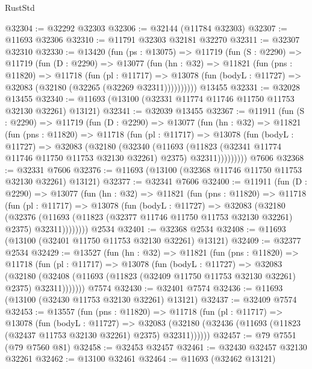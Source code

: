 \begin{lexlean}{RustStd}
\begin{coremodule}
@32304 := @32292 @32303
@32306 := @32144 (@11784 @32303)
@32307 := @11693 @32306
@32310 := @11791 @32303 @32181 @32270
@32311 := @32307 @32310
@32330 := @13420
    (fun (ps : @13075) =>
    @11719
      (fun (S : @2290) =>
      @11719
        (fun (D : @2290) =>
        @13077
          (fun (hn : @32) =>
          @11821
            (fun (pns : @11820) =>
            @11718
              (fun (pl : @11717) =>
              @13078 (fun (bodyL : @11727) => @32083 (@32180 (@32265 (@32269 @32311))))))))))
    @13455
@32331 := @32028 @13455
@32340 := @11693 (@13100 (@32331 @11774 @11746 @11750 @11753 @32130 @32261) @13121)
@32341 := @32039 @13455
@32367 := @11911
    (fun (S : @2290) =>
    @11719
      (fun (D : @2290) =>
      @13077
        (fun (hn : @32) =>
        @11821
          (fun (pns : @11820) =>
          @11718
            (fun (pl : @11717) =>
            @13078
              (fun (bodyL : @11727) =>
              @32083
                (@32180
                  (@32340
                    (@11693
                      (@11823 (@32341 @11774 @11746 @11750 @11753 @32130 @32261) @2375)
                      @32311)))))))))
    @7606
@32368 := @32331 @7606
@32376 := @11693 (@13100 (@32368 @11746 @11750 @11753 @32130 @32261) @13121)
@32377 := @32341 @7606
@32400 := @11911
    (fun (D : @2290) =>
    @13077
      (fun (hn : @32) =>
      @11821
        (fun (pns : @11820) =>
        @11718
          (fun (pl : @11717) =>
          @13078
            (fun (bodyL : @11727) =>
            @32083
              (@32180
                (@32376
                  (@11693 (@11823 (@32377 @11746 @11750 @11753 @32130 @32261) @2375) @32311))))))))
    @2534
@32401 := @32368 @2534
@32408 := @11693 (@13100 (@32401 @11750 @11753 @32130 @32261) @13121)
@32409 := @32377 @2534
@32429 := @13527
    (fun (hn : @32) =>
    @11821
      (fun (pns : @11820) =>
      @11718
        (fun (pl : @11717) =>
        @13078
          (fun (bodyL : @11727) =>
          @32083
            (@32180
              (@32408 (@11693 (@11823 (@32409 @11750 @11753 @32130 @32261) @2375) @32311)))))))
    @7574
@32430 := @32401 @7574
@32436 := @11693 (@13100 (@32430 @11753 @32130 @32261) @13121)
@32437 := @32409 @7574
@32453 := @13557
    (fun (pns : @11820) =>
    @11718
      (fun (pl : @11717) =>
      @13078
        (fun (bodyL : @11727) =>
        @32083 (@32180 (@32436 (@11693 (@11823 (@32437 @11753 @32130 @32261) @2375) @32311))))))
@32457 := @79 @7551 (@79 @7560 @81)
@32458 := @32453 @32457
@32461 := @32430 @32457 @32130 @32261
@32462 := @13100 @32461
@32464 := @11693 (@32462 @13121)

\end{coremodule}
\end{lexlean}
